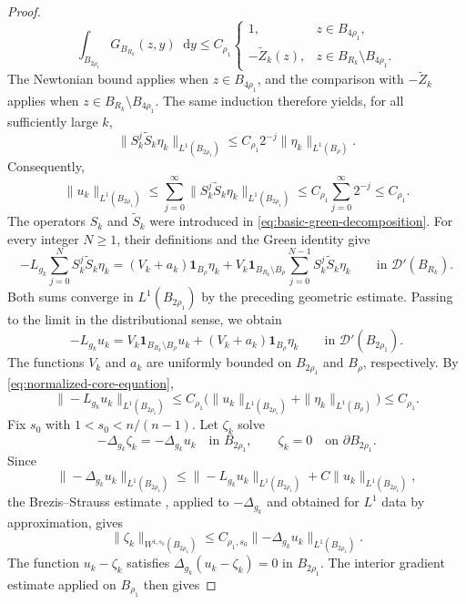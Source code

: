 \documentclass[11pt]{article}
\numberwithin{equation}{section}
\theoremstyle{remark}
\newcommand{\dd}{\mathop{}\!\mathrm{d}}
\begin{document}
\begin{proof}
{
\[
 \int_{B_{2\rho_1}}G_{B_{R_k}}(z,y)\dd y
 \le C_{\rho_1}
 \begin{cases}
  1,&z\in B_{4\rho_1},\\
  -\widetilde Z_k(z),&z\in B_{R_k}\setminus B_{4\rho_1}.
\end{cases}
\]
}
\nopagebreak[4]
The Newtonian bound applies when $z\in B_{4\rho_1}$, and the
comparison with $-\widetilde Z_k$ applies when
$z\in B_{R_k}\setminus B_{4\rho_1}$.  The same induction therefore yields,
for all sufficiently large $k$,
{
\[
 \|S_k^j\widetilde S_k\eta_k\|_{L^1(B_{2\rho_1})}
 \le C_{\rho_1} 2^{-j}\|\eta_k\|_{L^1(B_\rho)}.
\]
}
 Consequently,
{
\[
 \|u_k\|_{L^1(B_{2\rho_1})}
 \le\sum_{j=0}^{\infty}
 \|S_k^j\widetilde S_k\eta_k\|_{L^1(B_{2\rho_1})}
 \le C_{\rho_1}\sum_{j=0}^{\infty}2^{-j}
 \le C_{\rho_1}.
\]
}
The operators $S_k$ and $\widetilde S_k$ were introduced in
\eqref{eq:basic-green-decomposition}.  For every integer $N\ge1$, their
definitions and the Green identity give
{
\[
 -L_{g_k}\sum_{j=0}^{N}S_k^j\widetilde S_k\eta_k
 =(V_k+a_k)\mathbf1_{B_\rho}\eta_k
 +V_k\mathbf1_{B_{R_k}\setminus B_\rho}
   \sum_{j=0}^{N-1}S_k^j\widetilde S_k\eta_k \qquad \text{in } \mathcal D'(B_{R_k}).
\]
}
Both sums converge in $L^1(B_{2\rho_1})$ by the preceding geometric
estimate.  Passing to the limit in the  distributional sense, we obtain
{
\begin{equation}\label{eq:normalized-core-equation}
 -L_{g_k}u_k
 =V_k\mathbf1_{B_{R_k}\setminus B_\rho}u_k
  +(V_k+a_k)\mathbf1_{B_\rho}\eta_k
 \qquad\text{in }\mathcal D'(B_{2\rho_1}).
\end{equation}
}
 The functions $V_k$ and $a_k$ are uniformly bounded on $B_{2\rho_1}$
and $B_\rho$, respectively.  By \eqref{eq:normalized-core-equation},
{
\[
 \|\!-\!L_{g_k}u_k\|_{L^1(B_{2\rho_1})}
 \le C_{\rho_1}\bigl(
 \|u_k\|_{L^1(B_{2\rho_1})}
 +\|\eta_k\|_{L^1(B_\rho)}\bigr)
 \le C_{\rho_1}.
\]
}
 Fix $s_0$ with $1<s_0<n/(n-1)$.
{Let $\zeta_k$ solve
\[
 -\Delta_{g_k}\zeta_k=-\Delta_{g_k}u_k
 \quad\text{in }B_{2\rho_1},
 \qquad \zeta_k=0\quad\text{on }\partial B_{2\rho_1}.
\]
Since
\[
 \|-\Delta_{g_k}u_k\|_{L^1(B_{2\rho_1})}
 \le \|-L_{g_k}u_k\|_{L^1(B_{2\rho_1})}
 {}+C\|u_k\|_{L^1(B_{2\rho_1})},
\]
the Brezis--Strauss estimate
\cite[Lemma  9]{BrezisStrauss}, applied to \(-\Delta_{g_k}\) and obtained
for \(L^1\) data by approximation, gives
\[
 \|\zeta_k\|_{W^{1,s_0}(B_{2\rho_1})}
 \le C_{\rho_1,s_0}
 \|{-\Delta_{g_k}u_k}\|_{L^1(B_{2\rho_1})}.
\]
The function \(u_k-\zeta_k\) satisfies
\(\Delta_{g_k}(u_k-\zeta_k)=0\) in \(B_{2\rho_1}\).
The interior gradient estimate applied on $B_{\rho_1}$ then gives}

\end{proof}
\end{document}
